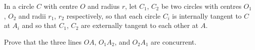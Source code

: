 In a circle $C$ with centre $O$ and radius $r$, let $C_1$, $C_2$ be two circles with centres $O_1$, $O_2$ and radii $r_1$, $r_2$ respectively, so that each circle $C_i$ is internally tangent to $C$ at $A_i$ and so that $C_1$, $C_2$ are externally tangent to each other at $A$.

Prove that the three lines $OA$, $O_1 A_2$, and $O_2 A_1$ are concurrent.